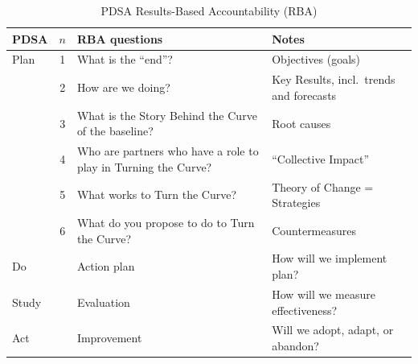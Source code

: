 \documentclass[landscape]{article}
\begin{document}
\begin{table}
  \centering
  \caption{PDSA Results-Based Accountability (RBA)}
\begin{tabular}{lcll}
\toprule
             PDSA&$n$&RBA questions&Notes\\
\midrule
  Plan &1&What is the ``end''? &Objectives (goals)\\
       &2&How are we doing? &Key Results, incl.\ trends and forecasts\\
       &3&What is the Story Behind the Curve of the baseline?&Root causes\\
       &4&Who are partners who have a role to play in Turning the
         Curve?&``Collective Impact''\\
       &5&What works to Turn the Curve?&Theory of Change = Strategies\\
       &6&What do you propose to do to Turn the Curve?&Countermeasures\\
  Do   &&Action plan&How will we implement plan?\\
  Study&&Evaluation&How will we measure effectiveness?\\
  Act &&Improvement&Will we adopt, adapt, or abandon?\\
\bottomrule
\end{tabular}   
\end{table}
\bigskip
\end{document}
